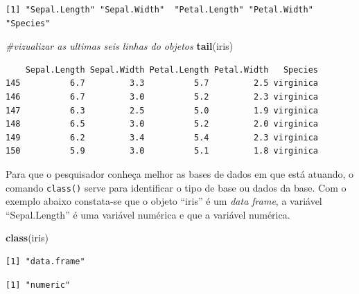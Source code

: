 \documentclass[12pt,portuguese,oneside]{book}
\newenvironment{Shaded}{\begin{snugshade}}{\end{snugshade}}
\newcommand{\KeywordTok}[1]{\textcolor[rgb]{0.13,0.29,0.53}{\textbf{#1}}}
\newcommand{\CommentTok}[1]{\textcolor[rgb]{0.56,0.35,0.01}{\textit{#1}}}
\newcommand{\OperatorTok}[1]{\textcolor[rgb]{0.81,0.36,0.00}{\textbf{#1}}}
\newcommand{\NormalTok}[1]{#1}
\begin{document}
\begin{verbatim}
[1] "Sepal.Length" "Sepal.Width"  "Petal.Length" "Petal.Width"  "Species"     
\end{verbatim}

\begin{Shaded}
\begin{Highlighting}[]
\CommentTok{#vizualizar as ultimas seis linhas do objetos}
\KeywordTok{tail}\NormalTok{(iris)}
\end{Highlighting}
\end{Shaded}

\begin{verbatim}
    Sepal.Length Sepal.Width Petal.Length Petal.Width   Species
145          6.7         3.3          5.7         2.5 virginica
146          6.7         3.0          5.2         2.3 virginica
147          6.3         2.5          5.0         1.9 virginica
148          6.5         3.0          5.2         2.0 virginica
149          6.2         3.4          5.4         2.3 virginica
150          5.9         3.0          5.1         1.8 virginica
\end{verbatim}

Para que o pesquisador conheça melhor as bases de dados em que está
atuando, o comando \texttt{class()} serve para identificar o tipo de
base ou dados da base. Com o exemplo abaixo constata-se que o objeto
``iris'' é um \emph{data frame}, a variável ``Sepal.Length'' é uma
variável numérica e que a variável numérica.

\begin{Shaded}
\begin{Highlighting}[]
\KeywordTok{class}\NormalTok{(iris)}
\end{Highlighting}
\end{Shaded}

\begin{verbatim}
[1] "data.frame"
\end{verbatim}

\begin{Shaded}
\end{Shaded}

\begin{verbatim}
[1] "numeric"
\end{verbatim}

\begin{Shaded}
\end{Shaded}
\end{document}
